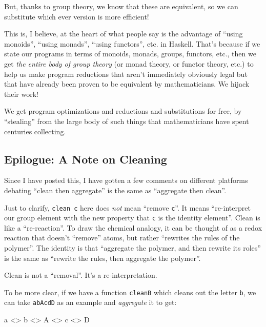\documentclass[]{article}
\newenvironment{Shaded}{}{}
\newcommand{\DataTypeTok}[1]{\textcolor[rgb]{0.56,0.13,0.00}{#1}}
\newcommand{\FunctionTok}[1]{\textcolor[rgb]{0.02,0.16,0.49}{#1}}
\newcommand{\NormalTok}[1]{#1}
\begin{document}
But, thanks to group theory, we know that these are equivalent, so we can
substitute which ever version is more efficient!

This is, I believe, at the heart of what people say is the advantage of ``using
monoids'', ``using monads'', ``using functors'', etc. in Haskell. That's because
if we state our programs in terms of monoids, monads, groups, functors, etc.,
then we get \emph{the entire body of group theory} (or monad theory, or functor
theory, etc.) to help us make program reductions that aren't immediately
obviously legal but that have already been proven to be equivalent by
mathematicians. We hijack their work!

We get program optimizations and reductions and substitutions for free, by
``stealing'' from the large body of such things that mathematicians have spent
centuries collecting.

\hypertarget{epilogue-a-note-on-cleaning}{%
\subsection{Epilogue: A Note on Cleaning}\label{epilogue-a-note-on-cleaning}}

Since I have posted this, I have gotten a few comments on different platforms
debating ``clean then aggregate'' is the same as ``aggregate then clean''.

Just to clarify, \texttt{clean\ c} here does \emph{not} mean ``remove
\texttt{c}''. It means ``re-interpret our group element with the new property
that \texttt{c} is the identity element''. Clean is like a ``re-reaction''. To
draw the chemical analogy, it can be thought of as a redox reaction that doesn't
``remove'' atoms, but rather ``rewrites the rules of the polymer''. The identity
is that ``aggregate the polymer, and then rewrite its roles'' is the same as
``rewrite the rules, then aggregate the polymer''.

Clean is not a ``removal''. It's a re-interpretation.

To be more clear, if we have a function \texttt{cleanB} which cleans out the
letter \texttt{b}, we can take \texttt{abAcdD} as an example and
\emph{aggregate} it to get:

\begin{Shaded}
\begin{Highlighting}[]
\NormalTok{a }\FunctionTok{<>}\NormalTok{ b }\FunctionTok{<>} \DataTypeTok{A} \FunctionTok{<>}\NormalTok{ c }\FunctionTok{<>} \DataTypeTok{D}
\end{Highlighting}
\end{Shaded}
\end{document}

